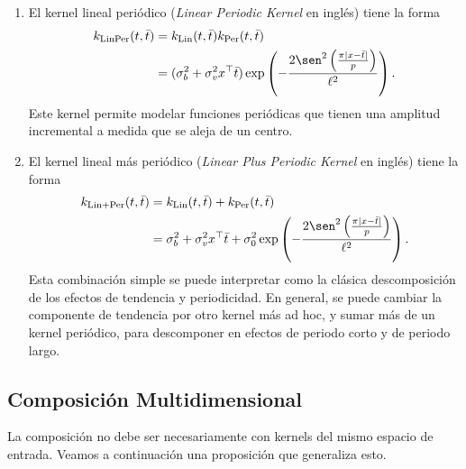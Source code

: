 \begin{enumerate}
	\item El kernel lineal periódico (\emph{Linear Periodic Kernel} en inglés) tiene la forma
	\begin{align*}
		k_{\mathrm{LinPer}}(t, \bar{t})	&= k_{\mathrm{Lin}}(t, \bar{t}) k_{\mathrm{Per}}(t, \bar{t}) \\
										&= (\sigma_{b}^{2} + \sigma_{v}^{2} x^\top \bar{t}) \exp \left(-\frac{2\sen^{2} \left(\frac{\pi \vert x - \bar{t} \vert}{p}\right)}{\ell^{2}}\right).
	\end{align*}
	Este kernel permite modelar funciones periódicas que tienen una amplitud incremental a medida que se aleja de un centro.
	\item El kernel lineal más periódico (\emph{Linear Plus Periodic Kernel} en inglés) tiene la forma
	\begin{align*}
		k_{\mathrm{Lin+Per}}(t, \bar{t})	&= k_{\mathrm{Lin}}(t, \bar{t}) + k_{\mathrm{Per}}(t, \bar{t}) \\
											&= \sigma_{b}^{2} + \sigma_{v}^{2} x^\top \bar{t} + \sigma_{0}^{2} \exp \left(-\frac{2\sen^{2}\left(\frac{\pi \vert x - \bar{t}\vert}{p}\right)}{\ell^{2}}\right).
	\end{align*}
	Esta combinación simple se puede interpretar como la clásica descomposición de los efectos de tendencia y periodicidad. En general, se puede cambiar la componente de tendencia por otro kernel más ad hoc, y sumar más de un kernel periódico, para descomponer en efectos de periodo corto y de periodo largo.
\end{enumerate}

\subsection{Composición Multidimensional}

La composición no debe ser necesariamente con kernels del mismo espacio de entrada. Veamos a continuación una proposición que generaliza esto.

